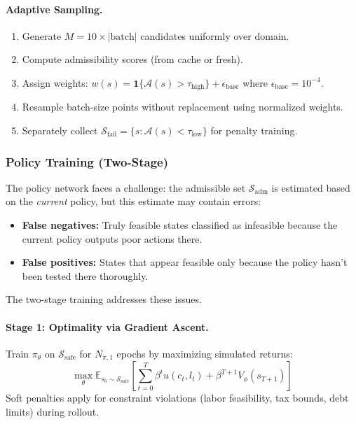 \paragraph{Adaptive Sampling.}
\begin{enumerate}
    \item Generate $M = 10 \times |\text{batch}|$ candidates uniformly over domain.
    \item Compute admissibility scores (from cache or fresh).
    \item Assign weights: $w(s) = \mathbf{1}\{\mathcal{A}(s) > \tau_{\text{high}}\} + \epsilon_{\text{base}}$ where $\epsilon_{\text{base}} = 10^{-4}$.
    \item Resample batch-size points without replacement using normalized weights.
    \item Separately collect $\mathcal{S}_{\text{fail}} = \{s : \mathcal{A}(s) < \tau_{\text{low}}\}$ for penalty training.
\end{enumerate}

\subsubsection{Policy Training (Two-Stage)}

The policy network faces a challenge: the admissible set $\mathcal{S}_{\text{adm}}$ is estimated based on the \textit{current} policy, but this estimate may contain errors:
\begin{itemize}
    \item \textbf{False negatives:} Truly feasible states classified as infeasible because the current policy outputs poor actions there.
    \item \textbf{False positives:} States that appear feasible only because the policy hasn't been tested there thoroughly.
\end{itemize}

The two-stage training addresses these issues.

\paragraph{Stage 1: Optimality via Gradient Ascent.}
Train $\pi_\theta$ on $\mathcal{S}_{\text{safe}}$ for $N_{\pi,1}$ epochs by maximizing simulated returns:
\begin{equation}
    \max_\theta \mathbb{E}_{s_0 \sim \mathcal{S}_{\text{safe}}} \left[ \sum_{t=0}^{T} \beta^t u(c_t, l_t) + \beta^{T+1} V_\phi(s_{T+1}) \right]
\end{equation}
Soft penalties apply for constraint violations (labor feasibility, tax bounds, debt limits) during rollout.

